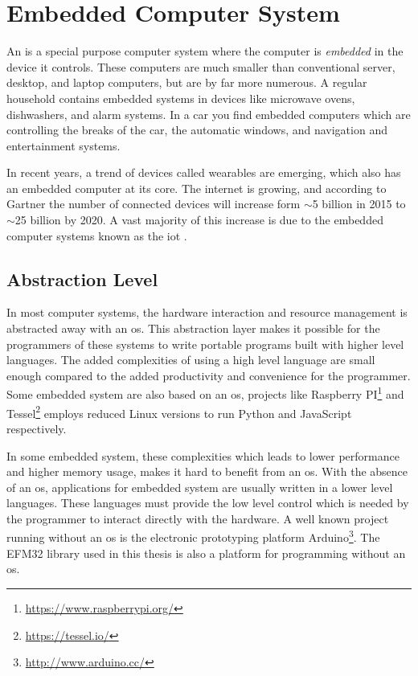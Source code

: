\section{Embedded Computer System}
An  is a special purpose computer system where the computer is \emph{embedded} in the device it controls.
These computers are much smaller than conventional server, desktop, and laptop computers, but are by far more numerous.
A regular household contains embedded systems in devices like microwave ovens, dishwashers, and alarm systems.
In a car you find embedded computers which are controlling the breaks of the car, the automatic windows, and navigation and entertainment systems.

In recent years, a trend of devices called wearables are emerging, which also has an embedded computer at its core.
The internet is growing, and according to Gartner \cite{web:gartner} the number of connected devices will increase form $\sim$5 billion in 2015 to $\sim$25 billion by 2020.
A vast majority of this increase is due to the embedded computer systems known as the \gls{iot} \cite{Valhouli2010}.

\subsection{Abstraction Level}
In most computer systems, the hardware interaction and resource management is abstracted away with an \gls{os}.
This abstraction layer makes it possible for the programmers of these systems to write portable programs built with higher level languages.
The added complexities of using a high level language are small enough compared to the added productivity and convenience for the programmer.
Some embedded system are also based on an \gls{os}, projects like Raspberry PI\footnote{\url{https://www.raspberrypi.org/}} and Tessel\footnote{\url{https://tessel.io/}} employs reduced Linux versions to run Python and JavaScript respectively.

In some embedded system, these complexities which leads to lower performance and higher memory usage, makes it hard to benefit from an \gls{os}.
With the absence of an \gls{os}, applications for embedded system are usually written in a lower level languages.
These languages must provide the low level control which is needed by the programmer to interact directly with the hardware.
A well known project running without an \gls{os} is the electronic prototyping platform Arduino\footnote{\url{http://www.arduino.cc/}}.
The EFM32 {\emlib} library used in this thesis is also a platform for {\C} programming without an \gls{os}.

